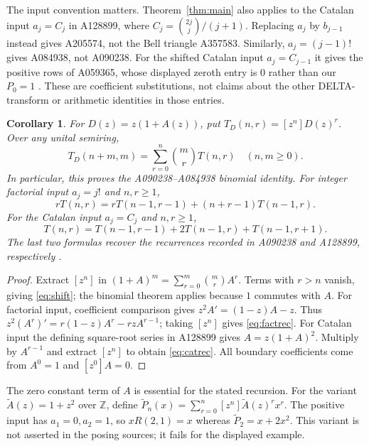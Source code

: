 \documentclass[11pt]{article}
\newtheorem{corollary}[theorem]{Corollary}
\begin{document}
The input convention matters. Theorem~\ref{thm:main} also applies to
the Catalan input $a_j=C_j$ in A128899, where
$C_j=\binom{2j}{j}/(j+1)$. Replacing $a_j$ by $b_{j-1}$ instead gives
A205574, not the Bell triangle A357583. Similarly,
$a_j=(j-1)!$ gives A084938, not A090238. For the shifted Catalan input
$a_j=C_{j-1}$ it gives the positive rows of A059365, whose displayed
zeroth entry is $0$ rather than our $P_0=1$ \cite{variants}.
These are coefficient substitutions, not claims about the other
DELTA-transform or arithmetic identities in those entries.

\begin{corollary}\label{cor:variants}
For $D(z)=z(1+A(z))$, put $T_D(n,r)=[z^n]D(z)^r$.
Over any unital semiring,
\begin{equation}\label{eq:shift}
 T_D(n+m,m)=\sum_{r=0}^{n}\binom mr T(n,r)\quad(n,m\geq0).
\end{equation}
In particular, this proves the A090238--A084938 binomial identity.
For integer factorial input $a_j=j!$ and $n,r\geq1$,
\begin{equation}\label{eq:factrec}
 rT(n,r)=rT(n-1,r-1)+(n+r-1)T(n-1,r).
\end{equation}
For the Catalan input $a_j=C_j$ and $n,r\geq1$,
\begin{equation}\label{eq:catrec}
 T(n,r)=T(n-1,r-1)+2T(n-1,r)+T(n-1,r+1).
\end{equation}
The last two formulas recover the recurrences recorded in A090238 and
A128899, respectively \cite{factorial,variants}.
\end{corollary}
\begin{proof}
Extract $[z^n]$ in $(1+A)^m=\sum_{r=0}^{m}\binom mr A^r$.
Terms with $r>n$ vanish, giving \eqref{eq:shift}; the binomial theorem
applies because $1$ commutes with $A$.
For factorial input, coefficient comparison gives
$z^2A'=(1-z)A-z$. Thus
$z^2(A^r)'=r(1-z)A^r-rzA^{r-1}$; taking $[z^n]$ gives
\eqref{eq:factrec}. For Catalan input the defining square-root series
in A128899 gives $A=z(1+A)^2$. Multiply by $A^{r-1}$ and extract
$[z^n]$ to obtain \eqref{eq:catrec}. All boundary coefficients come
from $A^0=1$ and $[z^0]A=0$.
\end{proof}

The zero constant term of $A$ is essential for the stated recursion.
For the variant $\widetilde A(z)=1+z^2$ over $\mathbb Z$, define
$\widetilde P_n(x)=\sum_{r=0}^n[z^n]\widetilde A(z)^r x^r$.
The positive input has $a_1=0,a_2=1$, so $xR(2,1)=x$ whereas
$\widetilde P_2=x+2x^2$. This variant is not asserted in the posing
sources; it fails for the displayed example.
\end{document}
